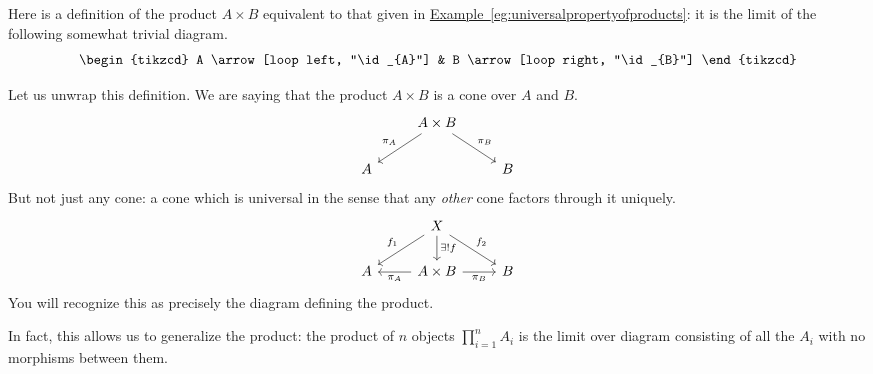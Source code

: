 \documentclass[main.tex]{subfiles}
\begin{document}
\begin{example}
  Here is a definition of the product $A \times B$ equivalent to that given in \hyperref[eg:universalpropertyofproducts]{Example~\ref*{eg:universalpropertyofproducts}}: it is the limit of the following somewhat trivial diagram.
  \begin{equation*}
    \begin{tikzcd}
      A
      \arrow[loop left, "\id_{A}"]
      & B
      \arrow[loop right, "\id_{B}"]
    \end{tikzcd}
  \end{equation*}

  Let us unwrap this definition. We are saying that the product $A \times B$ is a cone over $A$ and $B$.
  \begin{equation*}
    \begin{tikzcd}
      & A \times B
      \arrow[dl, swap, "\pi_{A}"]
      \arrow[dr, "\pi_{B}"]
      \\
      A & & B
    \end{tikzcd}
  \end{equation*}
  But not just any cone: a cone which is universal in the sense that any \emph{other} cone factors through it uniquely.
  \begin{equation*}
    \begin{tikzcd}
      & X
      \arrow[dl, swap, "f_{1}"]
      \arrow[dr, "f_{2}"]
      \arrow[d, "\exists!f"]
      \\
      A
      & A \times B
      \arrow[l, "\pi_{A}"]
      \arrow[r, swap, "\pi_{B}"]
      & B
    \end{tikzcd}
  \end{equation*}
  You will recognize this as precisely the diagram defining the product.

  In fact, this allows us to generalize the product: the product of $n$ objects $\prod_{i=1}^{n} A_{i}$ is the limit over diagram consisting of all the $A_{i}$ with no morphisms between them.
\end{example}
\end{document}

